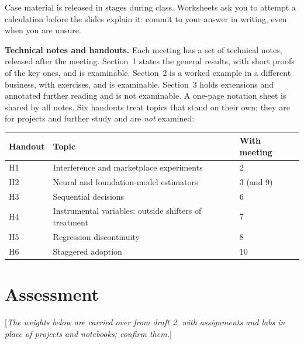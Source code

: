 \documentclass[11pt]{article}
\newcommand{\tbd}[1]{\textcolor{warnred}{[\emph{#1}]}}
\begin{document}
Case material is released in stages during class. Worksheets ask you to attempt a calculation before
the slides explain it: commit to your answer in writing, even when you are unsure.

\textbf{Technical notes and handouts.} Each meeting has a set of technical notes, released after the
meeting. Section~1 states the general results, with short proofs of the key ones, and is
examinable. Section~2 is a worked example in a different business, with exercises, and is
examinable. Section~3 holds extensions and annotated further reading and is not examinable. A
one-page notation sheet is shared by all notes. Six handouts treat topics that stand on their own;
they are for projects and further study and are \emph{not} examined:

\begin{center}
\small
\begin{tabular}{lll}
\toprule
\textbf{Handout} & \textbf{Topic} & \textbf{With meeting} \\
\midrule
H1 & Interference and marketplace experiments & 2 \\
H2 & Neural and foundation-model estimators & 3 (and 9) \\
H3 & Sequential decisions & 6 \\
H4 & Instrumental variables: outside shifters of treatment & 7 \\
H5 & Regression discontinuity & 8 \\
H6 & Staggered adoption & 10 \\
\bottomrule
\end{tabular}
\end{center}

\section*{Assessment}

\tbd{The weights below are carried over from draft 2, with assignments and labs in place of
projects and notebooks; confirm them.}
\end{document}
